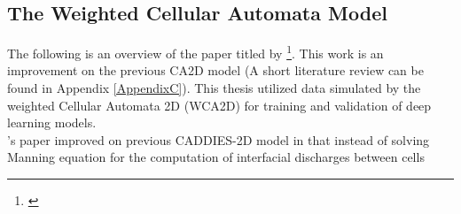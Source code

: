 \subsection{The Weighted Cellular Automata Model}
The following is an overview of the paper titled   by \citeauthor{guidolin2016weighted} \footnote{\cite{guidolin2016weighted}}. This work is an improvement on the previous CA2D model (A short literature review can be found in Appendix \ref{AppendixC}). This thesis utilized data simulated by the weighted Cellular Automata 2D (WCA2D) for training and validation of deep learning models.\\

\citeauthor{Ghimire}'s paper improved on previous CADDIES-2D model in that instead of solving Manning equation for the computation of interfacial discharges between cells 




